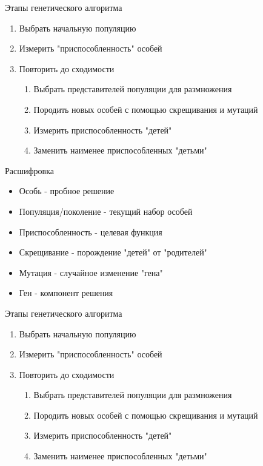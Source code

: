 \documentclass[14pt, fleqn, xcolor={dvipsnames, table}]{beamer}
\begin{document}
\begin{frame}{Этапы генетического алгоритма}
\begin{enumerate}
  \item Выбрать начальную популяцию
  \item Измерить "приспособленность" особей
  \item Повторить до сходимости
  \begin{enumerate}
    \item Выбрать представителей популяции для размножения
    \item Породить новых особей с помощью скрещивания и мутаций
    \item Измерить приспособленность "детей"
    \item Заменить наименее приспособленных "детьми"
  \end{enumerate}
\end{enumerate}
\end{frame}

\begin{frame}{Расшифровка}
\begin{itemize}
  \item Особь - пробное решение
  \item Популяция/поколение - текущий набор особей
  \item Приспособленность - целевая функция
  \item Скрещивание - порождение "детей" от "родителей"
  \item Мутация - случайное изменение "гена"
  \item Ген - компонент решения
\end{itemize}
\end{frame}


\begin{frame}{Этапы генетического алгоритма}
\begin{enumerate}
  \item Выбрать начальную популяцию
  \item Измерить "приспособленность" особей
  \item Повторить до сходимости
  \begin{enumerate}
    \item Выбрать представителей популяции для размножения
    \item Породить новых особей с помощью скрещивания и мутаций
    \item Измерить приспособленность "детей"
    \item Заменить наименее приспособленных "детьми"
  \end{enumerate}
\end{enumerate}
\end{frame}
\end{document}
